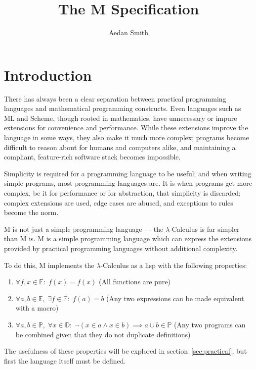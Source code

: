 \documentclass{article}
\title{The M Specification}
\author{Aedan Smith}
\begin{document}
    \maketitle
    \newpage

    \tableofcontents
    \newpage

    \section{Introduction}\label{sec:introduction}

    There has always been a clear separation between practical programming languages and mathematical programming constructs.
    Even languages such as ML and Scheme, though rooted in mathematics, have unnecessary or impure extensions for convenience and performance.
    While these extensions improve the language in some ways, they also make it much more complex;
    programs become difficult to reason about for humans and computers alike, and maintaining a compliant, feature-rich software stack becomes impossible.

    Simplicity is required for a programming language to be useful;
    and when writing simple programs, most programming languages are.
    It is when programs get more complex, be it for performance or for abstraction, that simplicity is discarded;
    complex extensions are used, edge cases are abused, and exceptions to rules become the norm.

    M is not just a simple programming language --- the $\lambda$-Calculus is far simpler than M is.
    M is a simple programming language which can express the extensions provided by practical programming languages without additional complexity.

    To do this, M implements the $\lambda$-Calculus as a lisp with the following properties:
    \begin{enumerate}
        \item $\forall f, x\in\mathbb{F}:\;f(x)=f(x)$ (All functions are pure)
        \item $\forall a, b\in\mathbb{E},\;\exists f\in\mathbb{F}:\;f(a)=b$ (Any two expressions can be made equivalent with a macro)
        \item $\forall a, b\in\mathbb{P},\;\forall x\in\mathbb{D}:\;\neg(x\in a\land x\in b)\implies a\cup b\in\mathbb{P}$ (Any two programs can be combined given that they do not duplicate definitions)
    \end{enumerate}

    The usefulness of these properties will be explored in section~\ref{sec:practical}, but first the language itself must be defined.
    \newpage
\end{document}
